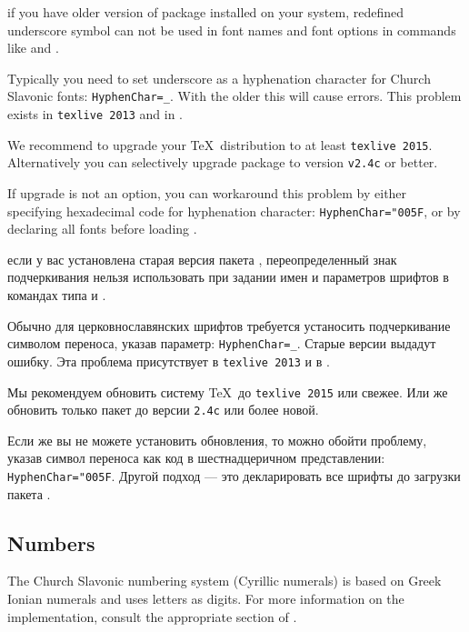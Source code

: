 \begin{EN}
 if you have older version of  package installed on your system,
redefined underscore symbol can not be used in font names and font options in  commands like
 and .

Typically you need to set underscore as a hyphenation character for Church Slavonic fonts: \texttt{HyphenChar=_}.
With the older  this will cause errors. This problem exists in \texttt{texlive 2013} and in .

We recommend to upgrade your \TeX\ distribution to at least \texttt{texlive 2015}. Alternatively you can selectively
upgrade  package to version \texttt{v2.4c} or better.

If upgrade is not an option, you can workaround this problem by either specifying hexadecimal code for hyphenation
character: \texttt{HyphenChar="005F}, or by declaring all fonts before loading .
\end{EN}

\begin{RU}
 если у вас установлена старая версия пакета , 
переопределенный знак подчеркивания нельзя использовать при задании имен и параметров шрифтов в командах  типа
 и .

Обычно для церковнославянских шрифтов требуется устаносить подчеркивание символом переноса, указав параметр:
\texttt{HyphenChar=_}. Старые версии  выдадут ошибку. 
Эта проблема присутствует в \texttt{texlive 2013} и в .

Мы рекомендуем обновить систему \TeX\ до \texttt{texlive 2015} или свежее. Или же обновить только пакет  до
версии \texttt{2.4c} или более новой.

Если же вы не можете установить обновления, то можно
обойти проблему, указав символ переноса как код в шестнадцеричном представлении:
\texttt{HyphenChar="005F}. Другой подход --- это декларировать все шрифты до загрузки пакета .
\end{RU}

\begin{EN}
\section{Numbers}

The Church Slavonic numbering system (Cyrillic numerals)
is based on Greek Ionian numerals and uses letters as digits.
For more information on the implementation, consult the appropriate section of \cite{UN41}.
\end{EN}

